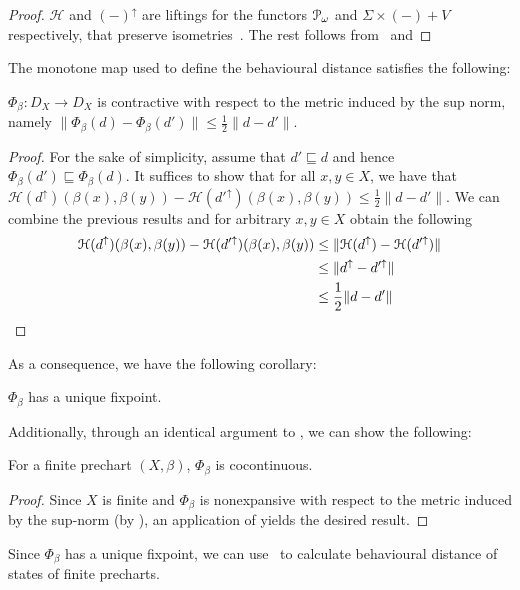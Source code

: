 	\begin{proof}
		$\mathcal{H}$ and $(-)^\uparrow$ are liftings for the functors $\mathcal{P}_\omega$ and $\Sigma \times (-) + V$ respectively, that preserve isometries~\cite[Theorem~5.8]{Baldan:2018:Coalgebraic}. The rest follows from~ and 
	\end{proof}
	The monotone map used to define the behavioural distance satisfies the following:
\begin{lemma}\label{c3:lem:contractive}
	$\Phi_\beta \colon D_X \to D_X$ is contractive with respect to the metric induced by the sup norm, namely $
	\|\Phi_\beta(d)-\Phi_\beta(d')\| \leq \frac{1}{2}\|d-d'\|
	$.
\end{lemma}
\begin{proof}
	For the sake of simplicity, assume that $d' \sqsubseteq d$ and hence $\Phi_\beta(d') \sqsubseteq \Phi_{\beta}(d)$. It suffices to show that for all $x,y \in X$, we have that $\mathcal{H}(d^\uparrow)(\beta(x), \beta(y)) -  \mathcal{H}(d'^\uparrow)(\beta(x), \beta(y))  \leq \frac{1}{2}\|d-d'\|$. We can combine the previous results and for arbitrary $x,y \in X$ obtain the following
	\begin{align*}
		\mathcal{H}(d^\uparrow)(\beta(x), \beta(y)) -  \mathcal{H}(d'^\uparrow)(\beta(x), \beta(y)) & \leq \|\mathcal{H}(d^\uparrow) - \mathcal{H}(d'^\uparrow)\| \\
		&\leq \|d^\uparrow - d'^\uparrow\|\\
		& \leq \frac{1}{2} \|d - d'\| \qedhere
	\end{align*}
\end{proof}
As a consequence, we have the following corollary:
\begin{corollary}
	$\Phi_\beta$ has a unique fixpoint.
\end{corollary}
Additionally, through an identical argument to , we can show the following:
\begin{lemma}\label{lem:cocontinuous}
	For a finite prechart $(X,\beta)$, $\Phi_\beta$ is cocontinuous.
\end{lemma}
\begin{proof}
	Since $X$ is finite and $\Phi_\beta$ is nonexpansive with respect to the metric induced by the sup-norm (by ), an application of  yields the desired result.
\end{proof}
Since $\Phi_\beta$ has a unique fixpoint, we can use~ to calculate behavioural distance of states of finite precharts.
